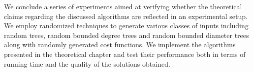 We conclude a series of experiments aimed at verifying whether the theoretical claims regarding the discussed algorithms are reflected in an experimental setup. We employ randomized techniques to generate various classes of inputs including random trees, random bounded degree trees and random bounded diameter trees along with randomly generated cost functions. We implement the algorithms presented in the theoretical chapter and test their performance both in terms of running time and the quality of the solutions obtained.
